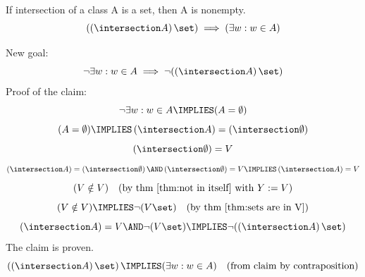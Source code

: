 \begin{theorem}
\label{thm:intersection set then}
If intersection of a class A is a set, then A is nonempty. 
\[
\left(\left(\intersection A\right)\set\right)
\implies
(\exists w: w\in A)
\]
\end{theorem}
\Proof
New goal:
\[
\neg\exists w: w\in A
\implies
\neg(\left(\intersection A\right)\set)
\]
Proof of the claim:
\[
\neg\exists w: w\in A
\IMPLIES
(A=\emptyset)
\]
\[
(A=\emptyset)
\IMPLIES
\left(\intersection A\right) = \left(\intersection \emptyset\right)
\]
\[
\left(\intersection \emptyset\right) = V
\]
\[
\left(\intersection A\right) = \left(\intersection \emptyset\right)
\AND
\left(\intersection \emptyset\right) = V
\IMPLIES
\left(\intersection A\right) = V
\]
\[
(V\notin V)
\quad\mbox{(by thm \ref{thm:not in itself} with $Y:=V$)}
\]
\[
(V\notin V)
\IMPLIES
\neg(V\set)
\quad\mbox{(by thm \ref{thm:sets are in V})}
\]
\[
\left(\intersection A\right) = V
\AND
\neg(V\set)
\IMPLIES
\neg(\left(\intersection A\right) \set)
\]
The claim is proven.
\[
\left(\left(\intersection A\right)\set\right)
\IMPLIES
(\exists w: w\in A)
\quad\mbox{(from claim by contraposition)}
\]
\Done


